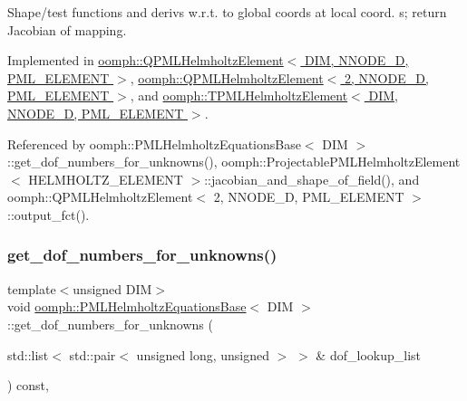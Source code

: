 Shape/test functions and derivs w.\+r.\+t. to global coords at local coord. s; return Jacobian of mapping. 



Implemented in \hyperlink{classoomph_1_1QPMLHelmholtzElement_a0d5e590e5bd51ba8d2331c6fdced4653}{oomph\+::\+Q\+P\+M\+L\+Helmholtz\+Element$<$ D\+I\+M, N\+N\+O\+D\+E\+\_\+D, P\+M\+L\+\_\+\+E\+L\+E\+M\+E\+N\+T $>$}, \hyperlink{classoomph_1_1QPMLHelmholtzElement_a0d5e590e5bd51ba8d2331c6fdced4653}{oomph\+::\+Q\+P\+M\+L\+Helmholtz\+Element$<$ 2, N\+N\+O\+D\+E\+\_\+D, P\+M\+L\+\_\+\+E\+L\+E\+M\+E\+N\+T $>$}, and \hyperlink{classoomph_1_1TPMLHelmholtzElement_a6a4c48e090653977917c463c628b0585}{oomph\+::\+T\+P\+M\+L\+Helmholtz\+Element$<$ D\+I\+M, N\+N\+O\+D\+E\+\_\+D, P\+M\+L\+\_\+\+E\+L\+E\+M\+E\+N\+T $>$}.



Referenced by oomph\+::\+P\+M\+L\+Helmholtz\+Equations\+Base$<$ D\+I\+M $>$\+::get\+\_\+dof\+\_\+numbers\+\_\+for\+\_\+unknowns(), oomph\+::\+Projectable\+P\+M\+L\+Helmholtz\+Element$<$ H\+E\+L\+M\+H\+O\+L\+T\+Z\+\_\+\+E\+L\+E\+M\+E\+N\+T $>$\+::jacobian\+\_\+and\+\_\+shape\+\_\+of\+\_\+field(), and oomph\+::\+Q\+P\+M\+L\+Helmholtz\+Element$<$ 2, N\+N\+O\+D\+E\+\_\+D, P\+M\+L\+\_\+\+E\+L\+E\+M\+E\+N\+T $>$\+::output\+\_\+fct().

\mbox{\label{classoomph_1_1PMLHelmholtzEquationsBase_a5a398f15e17d34ae45b571fb9a53a1c1}} 
\subsubsection{\texorpdfstring{get\+\_\+dof\+\_\+numbers\+\_\+for\+\_\+unknowns()}{get\_dof\_numbers\_for\_unknowns()}}
{\footnotesize\ttfamily template$<$unsigned D\+IM$>$ \\
void \hyperlink{classoomph_1_1PMLHelmholtzEquationsBase}{oomph\+::\+P\+M\+L\+Helmholtz\+Equations\+Base}$<$ D\+IM $>$\+::get\+\_\+dof\+\_\+numbers\+\_\+for\+\_\+unknowns (\begin{DoxyParamCaption}\item[{std\+::list$<$ std\+::pair$<$ unsigned long, unsigned $>$ $>$ \&}]{dof\+\_\+lookup\+\_\+list }\end{DoxyParamCaption}) const\hspace{0.3cm}{\ttfamily [inline]}, {\ttfamily [virtual]}}



